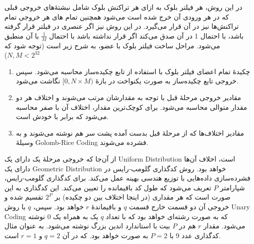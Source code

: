 در این روش، هر فیلتر بلوک به ازای هر تراکنش‌ بلوک شامل نبشتهٔ‌های خروجی قبلی که در هر ورودی‌ آن خرج شده است می‌شود همچنین تمام های هر خروجی تمام تراکنش‌ها نیز در آن قرار می‌گیرد. در این روش نیز اگر عنصری در فیلتر قرار گرفته باشد، با احتمال 1 در آن صدق می‌کند اگر قرار نداشته باشد با احتمال $\frac{1}{M}$ با آن منطبق می‌شود. مراحل ساخت فیلتر بلوک با  عضو، به شرح زیر است (توجه شود که
$N,M < 2^{32}$)
\begin{enumerate}
	\item {%
	چکیدهٔ تمام اعضای فیلتر بلوک با استفاده از تابع چکیده‌ساز  محاسبه می‌شود. سپس خروجی تابع چکیده‌ساز به صورت یکنواخت در بازهٔ 
	$[0, N\times M)$
	نگاشت می‌شود. 
}

\item {%
	مقادیر خروجی مرحلهٔ قبل با توجه به مقدارشان مرتب می‌شوند و اختلاف هر دو مقدار متوالی محاسبه می‌شود. برای کوچک‌ترین مقدار، اختلاف آن با صفر محاسبه می‌شود که برابر با خودش است.
 }

\item {%
مقادیر اختلاف‌ها که از مرحلهٔ قبل بدست آمده پشت سر هم نوشته می‌شوند و به وسیلهٔ 
\gls{Golomb-Rice Coding}
فشرده می‌شوند.
}

\end{enumerate}

از آن‌جا که خروجی مرحلهٔ یک دارای یک 
\gls{Uniform Distribution}
است،‌ اخلاف آن‌ها دارای یک 
\gls{Geometric Distribution}
خواهد بود. روش کدگذاری گلومب-رایس در فشرده‌سازی داده‌هایی با توزیع هندسی بهینه عمل می‌کند\cite{Osuntokun2-2017}. برای کدگذاری گلومب-رایس، شپارامتر $P$ تعریف می‌شود که طول کد باقیمانده را تعیین می‌کند. این کد‌گذاری به این صورت است که هر مقداری (در اینجا اختلاف بین دو چکیده) بر $2^P$ تقسیم شده و خروجی آن دو قسمت خارج قسمت $q$ و باقیماندهٔ $r$ خواهد بود. سپس، $q$ با روش 
\gls{Unary Coding}
 که به صورت رشته‌ای خواهد بود که با تعداد $q$ یک به همراه یک $0$ نوشته می‌شود. مقدار $r$ هم در $P$ بیت با استاندارد اندین بزرگ نوشته می‌شود. به عنوان مثال کدگذاری عدد $9$ با $P=2$  به صورت
 خواهد بود. که در آن $q=2$ و $r=1$ است.
 
